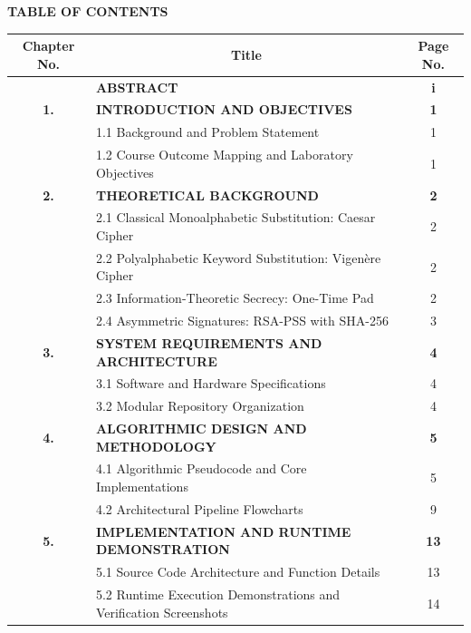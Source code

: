 \documentclass[12pt,a4paper]{report}
\begin{document}
\newpage

\begin{center}
    {\fontsize{14}{16}\bfseries TABLE OF CONTENTS}\\[1.5em]
\end{center}

\begin{table}[h!]
\centering
\fontsize{10.5}{13.5}\selectfont
\begin{tabular}{|c|p{4.7in}|c|}
\hline
\rowcolor{tableheader}
\textbf{Chapter No.} & \multicolumn{1}{c|}{\textbf{Title}} & \textbf{Page No.} \\
\hline
& \textbf{ABSTRACT} & \textbf{i} \\
\hline
\textbf{1.} & \textbf{INTRODUCTION AND OBJECTIVES} & \textbf{1} \\
& 1.1 Background and Problem Statement & 1 \\
& 1.2 Course Outcome Mapping and Laboratory Objectives & 1 \\
\hline
\textbf{2.} & \textbf{THEORETICAL BACKGROUND} & \textbf{2} \\
& 2.1 Classical Monoalphabetic Substitution: Caesar Cipher & 2 \\
& 2.2 Polyalphabetic Keyword Substitution: Vigen\`ere Cipher & 2 \\
& 2.3 Information-Theoretic Secrecy: One-Time Pad & 2 \\
& 2.4 Asymmetric Signatures: RSA-PSS with SHA-256 & 3 \\
\hline
\textbf{3.} & \textbf{SYSTEM REQUIREMENTS AND ARCHITECTURE} & \textbf{4} \\
& 3.1 Software and Hardware Specifications & 4 \\
& 3.2 Modular Repository Organization & 4 \\
\hline
\textbf{4.} & \textbf{ALGORITHMIC DESIGN AND METHODOLOGY} & \textbf{5} \\
& 4.1 Algorithmic Pseudocode and Core Implementations & 5 \\
& 4.2 Architectural Pipeline Flowcharts & 9 \\
\hline
\textbf{5.} & \textbf{IMPLEMENTATION AND RUNTIME DEMONSTRATION} & \textbf{13} \\
& 5.1 Source Code Architecture and Function Details & 13 \\
& 5.2 Runtime Execution Demonstrations and Verification Screenshots & 14 \\

\end{tabular}
\end{table}
\end{document}
